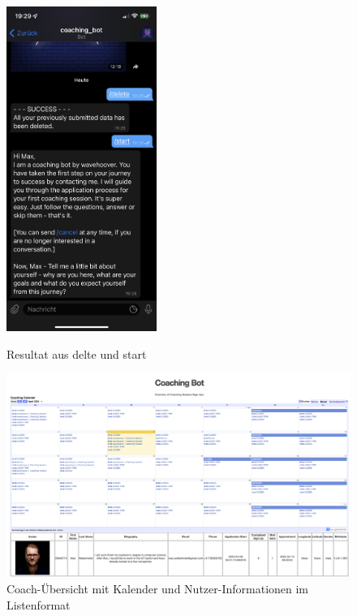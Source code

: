 	\begin{figure}
		\centering
		\begin{minipage}{.48\linewidth}
			\centering
			{\includegraphics[width=\linewidth,height=300pt,keepaspectratio]{images/Screenshots/delete-and-restart.PNG}}
		
			\caption{Resultat aus \/delte und \/start}
		\end{minipage}\quad
	\end{figure}


	\begin{figure}
		\centering
		\includegraphics[width=1\textwidth]{images/Screenshots/web-gui.png}
		\caption{Coach-Übersicht mit Kalender und Nutzer-Informationen im Listenformat}
		\label{fig: scs..web-gui}
	\end{figure}

